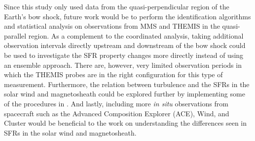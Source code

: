 Since this study only used data from the quasi-perpendicular region of the Earth's bow shock, future work would be to perform the identification algorithms and statistical analysis on observations from MMS and THEMIS in the quasi-parallel region. As a complement to the coordinated analysis, taking additional observation intervals directly upstream and downstream of the bow shock could be used to investigate the SFR property changes more directly instead of using an ensemble approach. There are, however, very limited observation periods in which the THEMIS probes are in the right configuration for this type of measurement. Furthermore, the relation between turbulence and the SFRs in the solar wind and magnetosheath could be explored further by implementing some of the procedures in \cite{Zank2:2021, Adhikari:2022, Zhao:2022}. And lastly, including more \textit{in situ} observations from spacecraft such as the Advanced Composition Explorer (ACE), Wind, and Cluster would be beneficial to the work on understanding the differences seen in SFRs in the solar wind and magnetosheath.